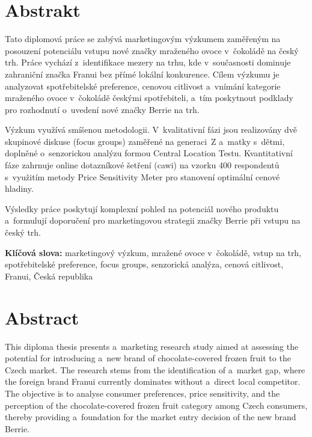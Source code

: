 \chapter*{Abstrakt}

Tato diplomová práce se zabývá marketingovým výzkumem zaměřeným na posouzení potenciálu vstupu nové značky mraženého ovoce v~čokoládě na český trh. Práce vychází z~identifikace mezery na trhu, kde v~současnosti dominuje zahraniční značka Franui bez přímé lokální konkurence. Cílem výzkumu je analyzovat spotřebitelské preference, cenovou citlivost a~vnímání kategorie mraženého ovoce v~čokoládě českými spotřebiteli, a~tím poskytnout podklady pro rozhodnutí o~uvedení nové značky Berrie na trh.

Výzkum využívá smíšenou metodologii. V~kvalitativní fázi jsou realizovány dvě skupinové diskuse (focus groups) zaměřené na generaci~Z a~matky s~dětmi, doplněné o~senzorickou analýzu formou Central Location Testu. Kvantitativní fáze zahrnuje online dotazníkové šetření (\gls{cawi}) na vzorku 400 respondentů s~využitím metody Price Sensitivity Meter pro stanovení optimální cenové hladiny.

Výsledky práce poskytují komplexní pohled na potenciál nového produktu a~formulují doporučení pro marketingovou strategii značky Berrie při vstupu na český trh.

\vspace{5mm}
\noindent\textbf{Klíčová slova:} marketingový výzkum, mražené ovoce v~čokoládě, vstup na trh, spotřebitelské preference, focus groups, senzorická analýza, cenová citlivost, Franui, Česká republika

\newpage
\chapter*{Abstract}

This diploma thesis presents a~marketing research study aimed at assessing the potential for introducing a~new brand of chocolate-covered frozen fruit to the Czech market. The research stems from the identification of a~market gap, where the foreign brand Franui currently dominates without a~direct local competitor. The objective is to analyse consumer preferences, price sensitivity, and the perception of the chocolate-covered frozen fruit category among Czech consumers, thereby providing a~foundation for the market entry decision of the new brand Berrie.


